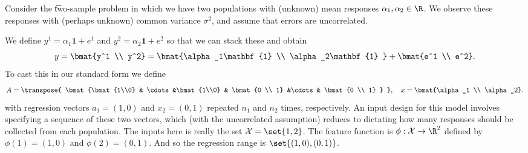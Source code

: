 Consider the \t{two-sample problem} in which we have two populations with (unknown) mean responses $\alpha _1, \alpha _2 \in \R $.
We observe these responses with (perhaps unknown) common variance $\sigma ^2$, and assume that errors are uncorrelated.

We define $y^1 = \alpha _1\mathbf{1}  + e^1$ and $y^2 = \alpha _2\mathbf{1}  + e^2$ so that we can stack these and obtain
    \[
y = \bmat{y^1 \\ y^2} = \bmat{\alpha _1\mathbf{1}  \\ \alpha _2\mathbf{1} } + \bmat{e^1 \\ e^2}.
    \]
To cast this in our standard form we define
    \[
A = \transpose{
\bmat{\bmat{1\\0} & \cdots &\bmat{1\\0} & \bmat{0 \\ 1} &\cdots & \bmat{0 \\ 1}
}
}, \quad x = \bmat{\alpha _1 \\ \alpha _2}.
    \]
with regression vectors $a_1 = (1, 0)$ and $x_2 = (0, 1)$ repeated $n_1$ and $n_2$ times, respectively.
An input design for this model involves specifying a sequence of these two vectors, which (with the uncorrelated assumption) reduces to dictating how many responses should be collected from each population.
The inputs here is really the set $\mathcal{X}  = \set{1, 2}$.
The feature function is $\phi : \mathcal{X}  \to \R ^2$ defined by $\phi (1) = (1, 0)$ and $\phi (2) = (0, 1)$.
And so the regression range is $\set{(1, 0), (0, 1)}$.
